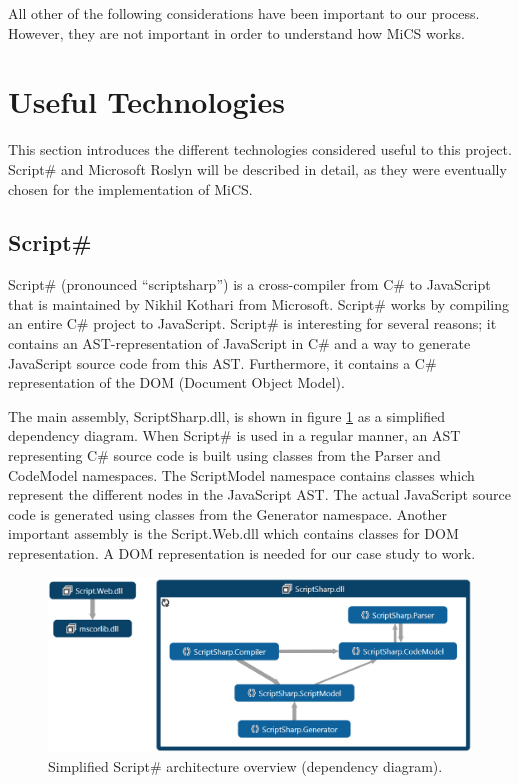 	All other of the following considerations have been important to our process. However, they are not important in order to understand how MiCS works.

\section{Useful Technologies}
	\label{sec:useful_technologies}
	This section introduces the different technologies considered useful to this project. Script\# and Microsoft Roslyn will be described in detail, as they were eventually chosen for the implementation of MiCS.

	

	\subsection{Script\#} %
	\label{sub:subsection_scriptsharp}
		Script\# (pronounced ``scriptsharp'') \cite{scriptsharp} is a cross-compiler from C\# to JavaScript that is maintained by Nikhil Kothari \cite{nikhilk} from Microsoft. Script\# works by compiling an entire C\# project to JavaScript. Script\# is interesting for several reasons; it contains an AST-representation of JavaScript in C\# and a way to generate JavaScript source code from this AST. Furthermore, it contains a C\# representation of the DOM (Document Object Model).

		The main assembly, ScriptSharp.dll, is shown in figure \ref{simplifiedOverview} as a simplified dependency diagram. When Script\# is used in a regular manner, an AST representing C\# source code is built using classes from the Parser and CodeModel namespaces. The ScriptModel namespace contains classes which represent the different nodes in the JavaScript AST. The actual JavaScript source code is generated using classes from the Generator namespace. Another important assembly is the Script.Web.dll which contains classes for DOM representation. A DOM representation is needed for our case study to work.

		\begin{figure}[H]
			\begin{center}
				\centerline{\includegraphics[width=16cm]{resources/images/SimplifiedOverview.png}}
			\end{center}
			\caption{Simplified Script\# architecture overview (dependency diagram).}
			\label{simplifiedOverview}
		\end{figure}


